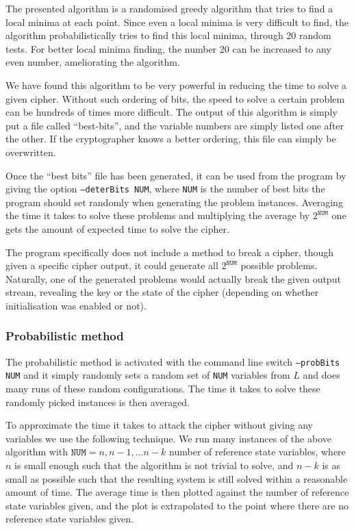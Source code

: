 \documentclass{llncs}
\begin{document}
The presented algorithm is a randomised greedy algorithm that tries to find a local minima at each point. Since even a local minima is very difficult to find, the algorithm probabilistically tries to find this local minima, through 20 random tests. For better local minima finding, the number 20 can be increased to any even number, ameliorating the algorithm.

We have found this algorithm to be very powerful in reducing the time to solve a given cipher. Without such ordering of bits, the speed to solve a certain problem can be hundreds of times more difficult. The output of this algorithm is simply put a file called ``best-bits'', and the variable numbers are simply listed one after the other. If the cryptographer knows a better ordering, this file can simply be overwritten.

Once the ``best bits'' file has been generated, it can be used from the program by giving the option \texttt{--deterBits NUM}, where \texttt{NUM} is the number of best bits the program should set randomly when generating the problem instances. Averaging the time it takes to solve these problems and multiplying the average by $2^{\texttt{NUM}}$ one gets the amount of expected time to solve the cipher.

The program specifically does not include a method to break a cipher, though given a specific cipher output, it could generate all $2^{\texttt{NUM}}$ possible problems. Naturally, one of the generated problems would actually break the given output stream, revealing the key or the state of the cipher (depending on whether initialisation was enabled or not).

\subsubsection{Probabilistic method}
The probabilistic method is activated with the command line switch \texttt{--probBits NUM} and it simply randomly sets a random set of \texttt{NUM} variables from $L$ and does many runs of these random configurations. The time it takes to solve these randomly picked instances is then averaged. %

To approximate the time it takes to attack the cipher without giving any variables we use the following technique. We run many instances of the above algorithm with $\texttt{NUM}=n, n-1, \ldots n-k$ number of reference state variables, where $n$ is small enough such that the algorithm is not trivial to solve, and $n-k$ is as small as possible such that the resulting system is still solved within a reasonable amount of time. The average time is then plotted against the number of reference state variables given, and the plot is extrapolated to the point where there are no reference state variables given.
\end{document}
